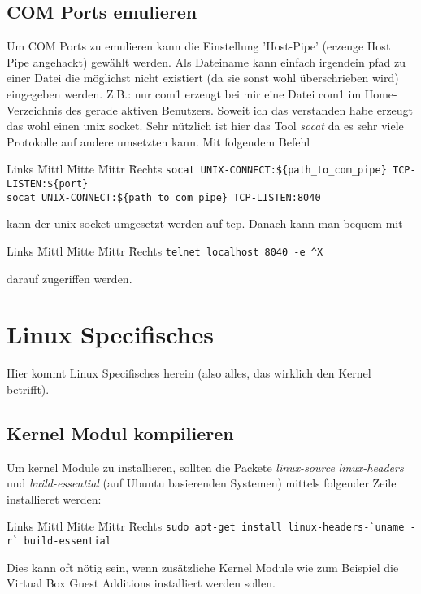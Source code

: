 \documentclass[12pt]{article}
\newenvironment{code}{\begin{tabbing}Links \= Mittl \= Mitte \= Mittr \= Rechts \kill}{\end{tabbing}}
\begin{document}
\subsection{COM Ports emulieren}
Um COM Ports zu emulieren kann die Einstellung 'Host-Pipe' (erzeuge Host Pipe angehackt)
gewählt werden. Als Dateiname kann einfach irgendein pfad zu einer Datei die möglichst nicht
existiert (da sie sonst wohl überschrieben wird) eingegeben werden.
Z.B.: nur com1 erzeugt bei mir eine Datei com1 im Home-Verzeichnis des gerade aktiven Benutzers.
Soweit ich das verstanden habe erzeugt das wohl einen unix socket. Sehr nützlich ist hier das Tool
\textit{socat} da es sehr viele Protokolle auf andere umsetzten kann. Mit folgendem Befehl
\begin{code}
	\> \verb#socat UNIX-CONNECT:${path_to_com_pipe} TCP-LISTEN:${port}# \\
	\> \verb#socat UNIX-CONNECT:${path_to_com_pipe} TCP-LISTEN:8040#
\end{code}
kann der unix-socket umgesetzt werden auf tcp. Danach kann man bequem mit
\begin{code}
	\> \verb#telnet localhost 8040 -e ^X#
\end{code}
darauf zugeriffen werden.

\section{Linux Specifisches}
Hier kommt Linux Specifisches herein (also alles, das wirklich den Kernel betrifft).

\subsection{Kernel Modul kompilieren}
Um kernel Module zu installieren, sollten die Packete \textit{linux-source} \textit{linux-headers} und \textit{build-essential} (auf Ubuntu basierenden Systemen) mittels folgender Zeile installieret werden:
\begin{code}
	\> \verb#sudo apt-get install linux-headers-`uname -r` build-essential#
\end{code}
Dies kann oft nötig sein, wenn zusätzliche Kernel Module wie zum Beispiel die Virtual Box Guest Additions installiert werden sollen.
\end{document}
